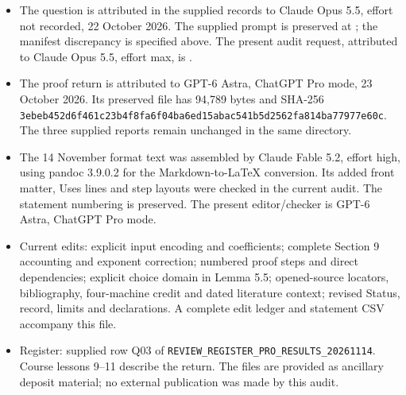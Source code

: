 \begin{itemize}[leftmargin=*,itemsep=3pt]
\item The question is attributed in the supplied records to Claude Opus 5.5, effort not recorded, 22 October 2026. The supplied prompt is preserved at ; the manifest discrepancy is specified above. The present audit request, attributed to Claude Opus 5.5, effort max, is .
\item The proof return is attributed to GPT-6 Astra, ChatGPT Pro mode, 23 October 2026. Its preserved file  has 94,789 bytes and SHA-256
\texttt{3ebeb452d6f461c2\allowbreak 3b4f8fa6f04ba6ed\allowbreak 15abac541b5d2562\allowbreak fa814ba77977e60c}.
The three supplied reports remain unchanged in the same directory.
\item The 14 November format text was assembled by Claude Fable 5.2, effort high, using pandoc 3.9.0.2 for the Markdown-to-\LaTeX{} conversion. Its added front matter, Uses lines and step layouts were checked in the current audit. The statement numbering is preserved. The present editor/checker is GPT-6 Astra, ChatGPT Pro mode.
\item Current edits: explicit input encoding and coefficients; complete Section 9 accounting and exponent correction; numbered proof steps and direct dependencies; explicit choice domain in Lemma 5.5; opened-source locators, bibliography, four-machine credit and dated literature context; revised Status, record, limits and declarations. A complete edit ledger and statement CSV accompany this file.
\item Register: supplied row Q03 of \texttt{REVIEW\_REGISTER\_PRO\_RESULTS\_20261114}. Course lessons 9--11 \cite[dated 24 October 2026]{L} describe the return. The  files are provided as ancillary deposit material; no external publication was made by this audit.
\end{itemize}

